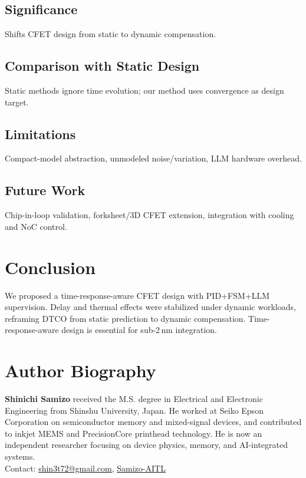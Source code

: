 \documentclass[conference]{IEEEtran}
\begin{document}
\subsection{Significance}
Shifts CFET design from static to dynamic compensation.  
\subsection{Comparison with Static Design}
Static methods ignore time evolution; our method uses convergence as design target.  
\subsection{Limitations}
Compact-model abstraction, unmodeled noise/variation, LLM hardware overhead.  
\subsection{Future Work}
Chip-in-loop validation, forksheet/3D CFET extension, integration with cooling and NoC control.  

\section{Conclusion}
We proposed a time-response-aware CFET design with PID+FSM+LLM supervision. Delay and thermal effects were stabilized under dynamic workloads, reframing DTCO from static prediction to dynamic compensation. Time-response-aware design is essential for sub-2\,nm integration.  




\section*{Author Biography}
\noindent\textbf{Shinichi Samizo} received the M.S. degree in Electrical and Electronic Engineering from Shinshu University, Japan. He worked at Seiko Epson Corporation on semiconductor memory and mixed-signal devices, and contributed to inkjet MEMS and PrecisionCore printhead technology. He is now an independent researcher focusing on device physics, memory, and AI-integrated systems.\\
Contact: \href{mailto:shin3t72@gmail.com}{shin3t72@gmail.com}, \href{https://github.com/Samizo-AITL}{Samizo-AITL}
\end{document}
